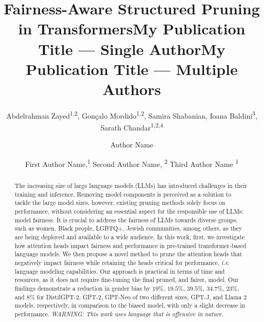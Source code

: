 \documentclass[letterpaper]{article} %
\title{Fairness-Aware Structured Pruning in Transformers}
\author{
     Abdelrahman Zayed\textsuperscript{\rm 1,2},
     Gonçalo Mordido\textsuperscript{\rm 1,2},
     Samira Shabanian,
     Ioana Baldini\textsuperscript{\rm 3},\\
     Sarath Chandar\textsuperscript{\rm 1,2,4}
}
\title{My Publication Title --- Single Author}
\author {
    Author Name
}
\title{My Publication Title --- Multiple Authors}
\author {
    First Author Name,\textsuperscript{\rm 1}
    Second Author Name, \textsuperscript{\rm 2}
    Third Author Name \textsuperscript{\rm 1}
}
\newcommand{\goncalo}[1]
{\textcolor{orange}{{\bf}{\em #1}{\bf}}}
\begin{document}
\maketitle
\begin{abstract}

The increasing size of large language models (LLMs) has introduced challenges in their training and inference. Removing model components is perceived as a solution to tackle the large model sizes, however, existing pruning methods solely focus on performance, without considering an essential aspect for the responsible use of LLMs: model fairness. It is crucial to address the fairness of LLMs towards diverse groups, such as women, Black people, LGBTQ+, Jewish communities, among others, as they are being deployed and available to a wide audience. In this work, first, we investigate how attention heads impact fairness and performance in pre-trained transformer-based language models. We then propose a novel method to prune the attention heads that negatively impact fairness while retaining the heads critical for performance, \textit{i.e.} language modeling capabilities. Our approach is practical in terms of time and resources, as it does not require fine-tuning the final pruned, and fairer, model. Our findings demonstrate a reduction in gender bias by $19\%$, $19.5\%$, $39.5\%$, $34.7\%$, $23\%$, and $8\%$ for DistilGPT-2, GPT-2, GPT-Neo of two different sizes, GPT-J, and Llama $2$ models, respectively, in comparison to the biased model, with only a slight decrease in performance. \textit{WARNING: This work uses language that is offensive in nature.}




\end{abstract}
\end{document}
